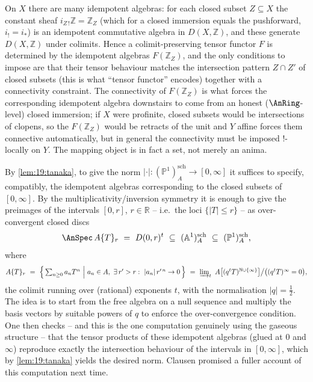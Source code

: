 \begin{remark}
\label{rmk:19:tanaka-reading}
On $X$ there are many idempotent algebras: for each closed subset $Z\subseteq X$
the constant sheaf $i_{Z\,!}\mathbb Z=\mathbb Z_Z$ (which for a closed immersion
equals the pushforward, $i_!=i_*$) is an idempotent commutative algebra in
$D(X,\mathbb Z)$, and these generate $D(X,\mathbb Z)$ under colimits. Hence a
colimit-preserving tensor functor $F$ is determined by the idempotent algebras
$F(\mathbb Z_Z)$, and the only conditions to impose are that their tensor
behaviour matches the intersection pattern $Z\cap Z'$ of closed subsets (this is
what ``tensor functor'' encodes) together with a connectivity constraint. The
connectivity of $F(\mathbb Z_Z)$ is what forces the corresponding idempotent
algebra downstairs to come from an honest ($\AnRing$-level) closed immersion; if
$X$ were profinite, closed subsets would be intersections of clopens, so the
$F(\mathbb Z_Z)$ would be retracts of the unit and $Y$ affine forces them
connective automatically, but in general the connectivity must be imposed
$!$-locally on $Y$. The mapping object is in fact a set, not merely an anima.
\end{remark}

\begin{remark}
\label{rmk:19:norm-construction}
By \cref{lem:19:tanaka}, to give the norm
$|\cdot|\colon(\mathbb P^1)^{\mathrm{sch}}_A\to[0,\infty]$ it suffices to specify,
compatibly, the idempotent algebras corresponding to the closed subsets of
$[0,\infty]$. By the multiplicativity/inversion symmetry it is enough to give the
preimages of the intervals $[0,r]$, $r\in\mathbb R$ -- i.e.\ the loci $\{|T|\le r\}$
-- as over-convergent closed discs
\begin{equation*}
\AnSpec\,A\{T\}_r\ =\ D(0,r)^{t}\ \subseteq\ (\mathbb A^1)^{\mathrm{sch}}_A
\ \subseteq\ (\mathbb P^1)^{\mathrm{sch}}_A,
\end{equation*}
where
\begin{equation*}
A\{T\}_r\ =\ \Bigl\{\,\textstyle\sum_{n\ge0} a_n T^{n}\ \Big|\ a_n\in A,\
\exists\, r'>r:\ |a_n|\,r'^{\,n}\to0\,\Bigr\}
\ =\ \varinjlim_{t}\ A\bigl[(q^{t}T)^{\mathbb N\cup\{\infty\}}\bigr]\big/\bigl((q^{t}T)^{\infty}=0\bigr),
\end{equation*}
the colimit running over (rational) exponents $t$, with the normalisation
$|q|=\tfrac12$. The idea is to start from the free algebra on a null sequence and
multiply the basis vectors by suitable powers of $q$ to enforce the
over-convergence condition. One then checks -- and this is the one computation
genuinely using the gaseous structure -- that the tensor products of these
idempotent algebras (glued at $0$ and $\infty$) reproduce exactly the intersection
behaviour of the intervals in $[0,\infty]$, which by \cref{lem:19:tanaka} yields
the desired norm. Clausen promised a fuller account of this computation next time.
\end{remark}

